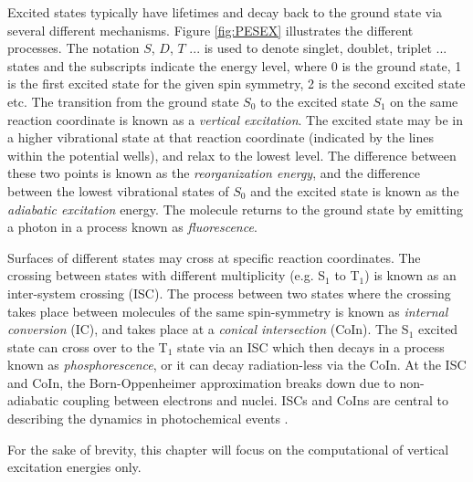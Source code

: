 Excited states typically have lifetimes and decay back to the ground state via several different mechanisms. Figure \ref{fig:PESEX} illustrates the different processes. The notation $S$, $D$, $T$ ... is used to denote singlet, doublet, triplet ... states and the subscripts indicate the energy level, where 0 is the ground state, 1 is the first excited state for the given spin symmetry, 2 is the second excited state etc. The transition from the ground state $S_0$ to the excited state $S_1$ on the same reaction coordinate is known as a \emph{vertical excitation}. The excited state may be in a higher vibrational state at that reaction coordinate (indicated by the lines within the potential wells), and relax to the lowest level. The difference between these two points is known as the \emph{reorganization energy}, and the difference between the lowest vibrational states of $S_0$ and the excited state is known as the \emph{adiabatic excitation} energy. The 
molecule returns to the ground state by emitting a photon in a process known as \emph{fluorescence}. 

Surfaces of different states may cross at specific reaction coordinates. The crossing between states with different multiplicity (e.g. S$_1$ to T$_1$) is known as an inter-system crossing (ISC). The process between two states where the crossing takes place between molecules of the same spin-symmetry is known as \emph{internal conversion} (IC), and takes place at a \emph{conical intersection} (CoIn). The S$_1$ excited state can cross over to the T$_1$ state via an ISC which then decays in a process known as \emph{phosphorescence}, or it can decay radiation-less via the CoIn. At the ISC and CoIn, the Born-Oppenheimer approximation breaks down due to non-adiabatic coupling between electrons and nuclei. ISCs and CoIns are central to describing the dynamics in photochemical events \cite{Mig2008,Mat2011,Kim2015,Zhu2016}.

For the sake of brevity, this chapter will focus on the computational of vertical excitation energies only.

